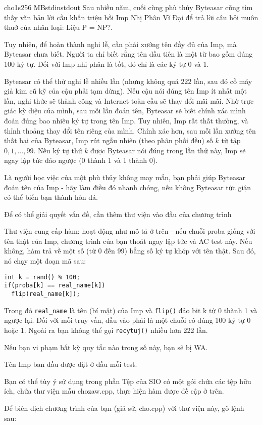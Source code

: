 \begin{problem}{cho}{1s}{256 MB}{stdin}{stdout}
Sau nhiều năm, cuối cùng phù thủy Byteasar cũng tìm thấy văn bản lời cầu khấn triệu
hồi Imp Nhị Phân Vĩ Đại để trả lời câu hỏi muôn thuở của nhân loại: Liệu P = NP?.

Tuy nhiên, để hoàn thành nghi lễ, cần phải xướng tên đầy đủ của Imp, mà Byteasar
chưa biết. Người ta chỉ biết rằng tên đầu tiên là một từ bao gồm đúng 100 ký tự. Đối
với Imp nhị phân là tốt, đó chỉ là các ký tự 0 và 1.

Byteasar có thể thử nghi lễ nhiều lần (nhưng không quá $222$ lần, sau đó cỗ máy giả kim
cũ kỹ của cậu phải tạm dừng). Nếu cậu nói đúng tên Imp ít nhất một lần, nghi thức sẽ
thành công và Internet toàn cầu sẽ thay đổi mãi mãi. Nhờ trực giác kỳ diệu của mình,
sau mỗi lần đoán tên, Byteasar sẽ biết chính xác mình đoán đúng bao nhiêu ký tự trong
tên Imp. Tuy nhiên, Imp rất thất thường, và thỉnh thoảng thay đổi tên riêng của mình.
Chính xác hơn, sau mỗi lần xướng tên thất bại của Byteasar, Imp rút ngẫu nhiên (theo
phân phối đều) số $k$ từ tập $0, 1, \dots, 99$. Nếu ký tự thứ $k$ được Byteasar nói đúng trong
lần thử này, Imp sẽ ngay lập tức đảo ngược (0 thành 1 và 1 thành 0).

Là người học việc của một phù thủy không may mắn, bạn phải giúp Byteasar đoán tên
của Imp - hãy làm điều đó nhanh chóng, nếu không Byteasar tức giận có thể biến bạn
thành hòn đá.


Để có thể giải quyết vấn đề, cần thêm thư viện vào đầu của chương trình


Thư viện cung cấp hàm:
hoạt động như mô tả ở trên - nếu chuỗi proba giống với tên thật của Imp, chương trình
của bạn thoát ngay lập tức và AC test này. Nếu không, hàm trả về một số (từ 0 đến 99)
bằng số ký tự khớp với tên thật. Sau đó, nó chạy một đoạn mã sau:

\begin{verbatim}
int k = rand() % 100;
if(proba[k] == real_name[k])
  flip(real_name[k]);
\end{verbatim}

Trong đó \verb|real_name| là tên (bí mật) của Imp và \verb|flip()| đảo bit k từ 0 thành 1 và ngược lại.
Đối với mỗi truy vấn, đầu vào phải là một chuỗi có đúng 100 ký tự 0 hoặc 1. Ngoài ra
bạn không thể gọi \texttt{recytuj()} nhiều hơn 222 lần.

Nếu bạn vi phạm bất kỳ quy tắc nào trong số này, bạn sẽ bị WA.

Tên Imp ban đầu được đặt ở đầu mỗi test.


Bạn có thể tùy ý sử dụng trong phần Tệp của SIO có một gói chứa các tệp hữu ích, chứa
thư viện mẫu chozaw.cpp, thực hiện hàm được đề cập ở trên.

Để biên dịch chương trình của bạn (giả sử, cho.cpp) với thư viện này, gõ lệnh sau:

\end{problem}